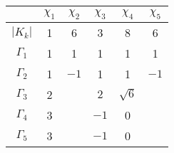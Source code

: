 \documentclass[11pt, english, fleqn, DIV=15, headinclude, BCOR=1cm]{scrartcl}
\begin{document}
\begin{tabular}{c|ccccc}
    & $\chi_1$ & $\chi_2$ & $\chi_3$ & $\chi_4$ & $\chi_5$ \\
    \midrule
    $|K_k|$ & 1 & 6 & 3 & 8 & 6 \\
    \midrule
    $\Gamma_1$ & 1 & 1 & 1 & 1 & 1 \\
    $\Gamma_2$ & 1 & $-1$ & 1 & 1 & $-1$ \\
    $\Gamma_3$ & 2 & & $2$ & $\sqrt 6$ & \\
    $\Gamma_4$ & 3 & & $-1$ & 0 & \\
    $\Gamma_5$ & 3 & & $-1$ & 0 & \\
\end{tabular}
\end{document}
